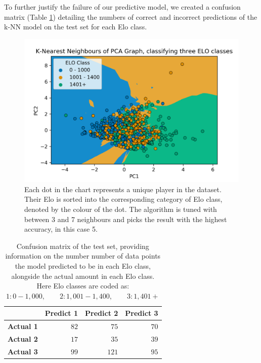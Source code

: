 \documentclass[10pt,a4paper]{article}
\begin{document}
\begin{multicols}{2}
To further justify the failure of our predictive model, we created a confusion matrix (Table \ref{tab:confusion_matrix}) detailing the numbers of correct and incorrect predictions of the k-NN model on the test set for each Elo class. 
\begin{figure}[t]
  \centering
  \includegraphics[width=\textwidth]{report/images/knn_graph.png}
  \caption{Each dot in the chart represents a unique player in the dataset. Their Elo is sorted into the corresponding category of Elo class, denoted by the colour of the dot. The algorithm is tuned with between 3 and 7 neighbours and picks the result with the highest accuracy, in this case 5.}
  \label{fds-project-template:fig:knn}
\end{figure}

\begin{table}[H]
  \centering
  \caption{Confusion matrix of the test set, providing information on the number number of data points the model predicted to be in each Elo class, alongside the actual amount in each Elo class. Here Elo classes are coded as: $1: 0 - 1,000, \qquad 2: 1,001 - 1,400, \qquad 3: 1,401+$}
  \label{tab:confusion_matrix}
    \begin{tabular}{lrrr}
        \toprule
        &\textbf{Predict 1}&\textbf{Predict 2}&\textbf{Predict 3}\\
        \midrule
        \textbf{Actual 1}&$82$&$ 75$&$70$\tabularnewline
        \textbf{Actual 2}&$17$&$ 35$&$39$\tabularnewline
        \textbf{Actual 3}&$ 99$&$ 121$&$95$\tabularnewline
        \bottomrule
    \end{tabular}
\end{table}


\end{multicols}
\end{document}
